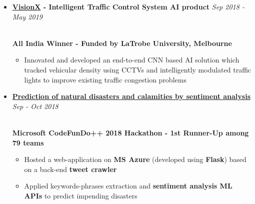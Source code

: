 \documentclass{article}
\begin{document}
\begin{itemize}

\item \textbf{\href{https://www.youtube.com/watch?v=jvNga9Yr2Rw}{VisionX} - Intelligent Traffic Control System AI product}
     \hfill\textit{Sep 2018 - May 2019}
     
     \vspace{-1.4mm}
     
     \\[3pt] \textbf{All India Winner - Funded by LaTrobe University, Melbourne}  \\

     \begin{itemize}
      
         \item Innovated and developed an end-to-end CNN based AI solution which tracked vehicular density using CCTVs and intelligently modulated traffic lights to improve existing traffic congestion problems
         

     \end{itemize}

\vspace{1mm}

\item \textbf{\href{https://github.com/aman161upadhyay/sacredgamers_codefundoMS} {Prediction of natural disasters and calamities by sentiment analysis}}
     \hfill\textit{Sep - Oct 2018}
     
     \vspace{-1.4mm}
     
     \\[3pt] \textbf{Microsoft CodeFunDo++ 2018 Hackathon - 1st Runner-Up among 79 teams}  \\

     \begin{itemize}
      
         \item Hosted a web-application on \textbf{MS Azure} (developed using \textbf{Flask}) based on a back-end \textbf{tweet crawler}
         \item Applied keywords-phrases extraction and \textbf{sentiment analysis ML APIs} to predict impending disasters

     \end{itemize}
     
\vspace{1mm}


\end{itemize}
\end{document}
